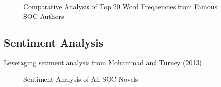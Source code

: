 \documentclass[
  letterpaper,
  DIV=11,
  numbers=noendperiod]{scrartcl}
\begin{document}
\begin{figure}
\begin{minipage}{0.50\linewidth}
\end{minipage}%
\newline
\begin{minipage}{0.50\linewidth}



\end{minipage}%

\caption{\label{fig-count}Comparative Analysis of Top 20 Word
Frequencies from Famous SOC Authors}

\end{figure}%

\newpage

\subsection{Sentiment Analysis}\label{sentiment-analysis}

Leveraging setiment analysis from Mohammad and Turney (2013)

\begin{figure}


\caption{\label{fig-sentiment}Sentiment Analysis of All SOC Novels}

\end{figure}%
\end{document}
